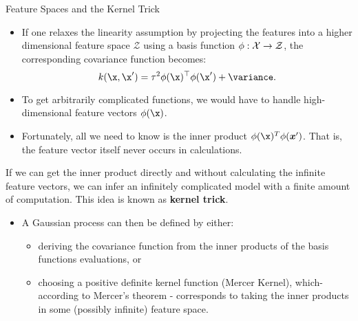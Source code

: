 \begin{frame}[c,allowframebreaks]{Feature Spaces and the Kernel Trick}
\begin{itemize}

\item If one relaxes the linearity assumption by projecting the features into a higher dimensional feature space $\mathcal{Z}$ using a basis function $\phi: \mathcal{X} \to \mathcal{Z}$, the corresponding covariance function becomes:
$$k(\x, \x^\prime) = \tau^2 \phi(\x)^\top\phi(\x^\prime) + \variance.$$
\vspace{.4cm}

\item To get arbitrarily complicated functions, we would have to handle high-dimensional feature vectors $\phi(\x)$.
\vspace{.4cm}

\item Fortunately, all we need to know is the inner product $\phi(\x)^T\phi(\bm{x}^\prime)$. That is, the feature vector itself never occurs in calculations.

\end{itemize}
\framebreak

\textcolor{blue}{\faLightbulbO} If we can get the inner product directly and without calculating the infinite feature vectors, we can infer an infinitely complicated model with a finite amount of computation. This idea is known as \textbf{kernel trick}.

\begin{itemize}
\vspace{.7cm}
\item A Gaussian process can then be defined by either:
\vspace{.3cm}
\begin{itemize}
\item deriving the covariance function from the inner products of the basis functions evaluations, or
\vspace{.3cm}
\item choosing a positive definite kernel function (Mercer Kernel), which- according to Mercer's theorem - corresponds to taking the inner products in some (possibly infinite) feature space.
\end{itemize}
\end{itemize}

\end{frame}


